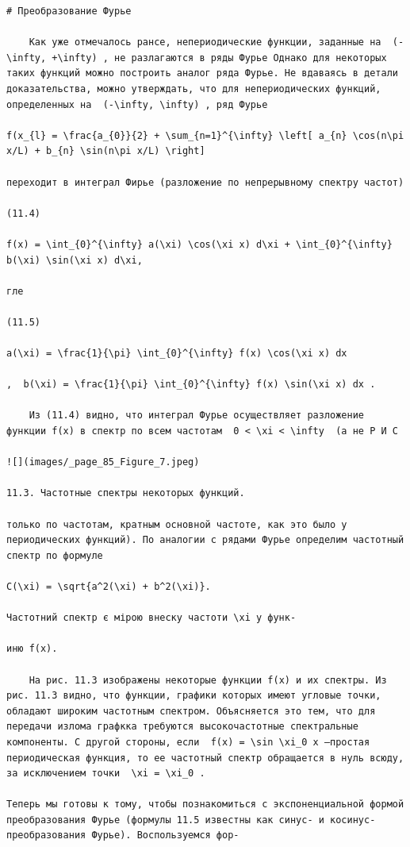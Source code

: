 \documentclass[
  ukrainian,
]{article}
\begin{document}
\begin{verbatim}
# Преобразование Фурье

    Как уже отмечалось рансе, непериодические функции, заданные на  (-\infty, +\infty) , не разлагаются в ряды Фурье Однако для некоторых таких функций можно построить аналог ряда Фурье. Не вдаваясь в детали доказательства, можно утверждать, что для непериодических функций, определенных на  (-\infty, \infty) , ряд Фурье

f(x_{l} = \frac{a_{0}}{2} + \sum_{n=1}^{\infty} \left[ a_{n} \cos(n\pi x/L) + b_{n} \sin(n\pi x/L) \right]

переходит в интеграл Фирье (разложение по непрерывному спектру частот)

(11.4)

f(x) = \int_{0}^{\infty} a(\xi) \cos(\xi x) d\xi + \int_{0}^{\infty} b(\xi) \sin(\xi x) d\xi,

гле

(11.5)

a(\xi) = \frac{1}{\pi} \int_{0}^{\infty} f(x) \cos(\xi x) dx

,  b(\xi) = \frac{1}{\pi} \int_{0}^{\infty} f(x) \sin(\xi x) dx .

    Из (11.4) видно, что интеграл Фурье осуществляет разложение функции f(x) в спектр по всем частотам  0 < \xi < \infty  (а не Р И С

![](images/_page_85_Figure_7.jpeg)

11.3. Частотные спектры некоторых функций.

только по частотам, кратным основной частоте, как это было у периодических функций). По аналогии с рядами Фурье определим частотный спектр по формуле

C(\xi) = \sqrt{a^2(\xi) + b^2(\xi)}.

Частотний спектр є мірою внеску частоти \xi у функ-

иню f(x).

    На рис. 11.3 изображены некоторые функции f(x) и их спектры. Из рис. 11.3 видно, что функции, графики которых имеют угловые точки, обладают широким частотным спектром. Объясняется это тем, что для передачи излома графкка требуются высокочастотные спектральные компоненты. С другой стороны, если  f(x) = \sin \xi_0 x —простая периодическая функция, то ее частотный спектр обращается в нуль всюду, за исключением точки  \xi = \xi_0 .

Теперь мы готовы к тому, чтобы познакомиться с экспоненциальной формой преобразования Фурье (формулы 11.5 известны как синус- и косинус-преобразования Фурье). Воспользуемся фор-


\end{verbatim}
\end{document}
